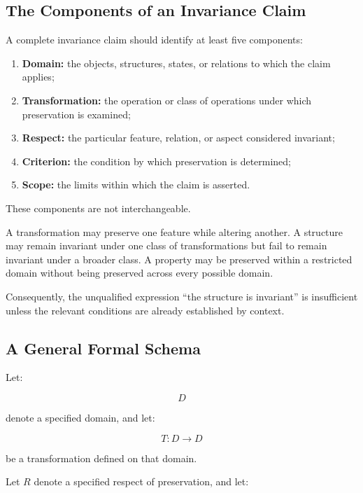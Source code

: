 \subsection{The Components of an Invariance Claim}

A complete invariance claim should identify at least
five components:

\begin{enumerate}
    \item \textbf{Domain:} the objects, structures,
    states, or relations to which the claim applies;

    \item \textbf{Transformation:} the operation or
    class of operations under which preservation
    is examined;

    \item \textbf{Respect:} the particular feature,
    relation, or aspect considered invariant;

    \item \textbf{Criterion:} the condition by which
    preservation is determined;

    \item \textbf{Scope:} the limits within which the
    claim is asserted.
\end{enumerate}

These components are not interchangeable.

A transformation may preserve one feature while
altering another. A structure may remain invariant
under one class of transformations but fail to
remain invariant under a broader class. A property
may be preserved within a restricted domain without
being preserved across every possible domain.

Consequently, the unqualified expression
``the structure is invariant'' is insufficient
unless the relevant conditions are already
established by context.

\subsection{A General Formal Schema}

Let:

\[
    D
\]

denote a specified domain, and let:

\[
    T : D \rightarrow D
\]

be a transformation defined on that domain.

Let \(R\) denote a specified respect of preservation,
and let:

